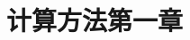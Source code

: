 \documentclass{ctexbeamer}
\title{计算方法第一章}
\theoremstyle{definition}
\begin{document}
\begin{frame}\frametitle{}
\titlepage
\end{frame}




\end{document}
